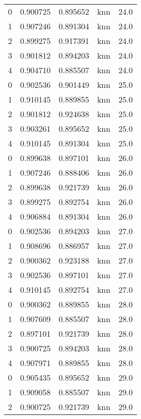 \begin{tabular}{rrrlr}
     0 & 0.900725 & 0.895652 &      knn &       24.0 \\
     1 & 0.907246 & 0.891304 &      knn &       24.0 \\
     2 & 0.899275 & 0.917391 &      knn &       24.0 \\
     3 & 0.901812 & 0.894203 &      knn &       24.0 \\
     4 & 0.904710 & 0.885507 &      knn &       24.0 \\
     0 & 0.902536 & 0.901449 &      knn &       25.0 \\
     1 & 0.910145 & 0.889855 &      knn &       25.0 \\
     2 & 0.901812 & 0.924638 &      knn &       25.0 \\
     3 & 0.903261 & 0.895652 &      knn &       25.0 \\
     4 & 0.910145 & 0.891304 &      knn &       25.0 \\
     0 & 0.899638 & 0.897101 &      knn &       26.0 \\
     1 & 0.907246 & 0.888406 &      knn &       26.0 \\
     2 & 0.899638 & 0.921739 &      knn &       26.0 \\
     3 & 0.899275 & 0.892754 &      knn &       26.0 \\
     4 & 0.906884 & 0.891304 &      knn &       26.0 \\
     0 & 0.902536 & 0.894203 &      knn &       27.0 \\
     1 & 0.908696 & 0.886957 &      knn &       27.0 \\
     2 & 0.900362 & 0.923188 &      knn &       27.0 \\
     3 & 0.902536 & 0.897101 &      knn &       27.0 \\
     4 & 0.910145 & 0.892754 &      knn &       27.0 \\
     0 & 0.900362 & 0.889855 &      knn &       28.0 \\
     1 & 0.907609 & 0.885507 &      knn &       28.0 \\
     2 & 0.897101 & 0.921739 &      knn &       28.0 \\
     3 & 0.900725 & 0.894203 &      knn &       28.0 \\
     4 & 0.907971 & 0.889855 &      knn &       28.0 \\
     0 & 0.905435 & 0.895652 &      knn &       29.0 \\
     1 & 0.909058 & 0.885507 &      knn &       29.0 \\
     2 & 0.900725 & 0.921739 &      knn &       29.0 \\

\end{tabular}
